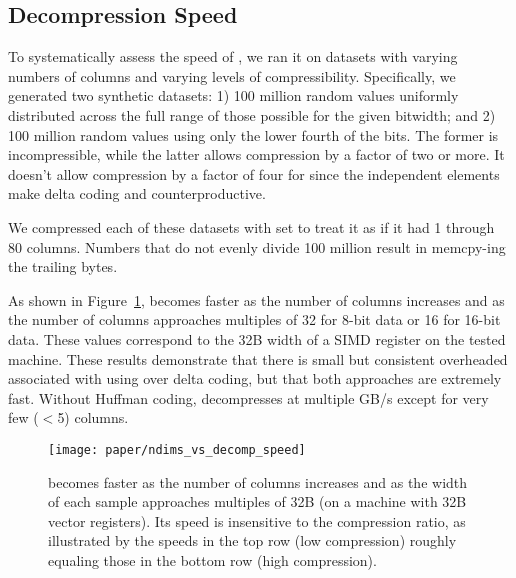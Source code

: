


\subsection{Decompression Speed}

To systematically assess the speed of \minesp, we ran it on datasets with varying numbers of columns and varying levels of compressibility. Specifically, we generated two synthetic datasets: 1) 100 million random values uniformly distributed across the full range of those possible for the given bitwidth; and 2) 100 million random values using only the lower fourth of the bits. The former is incompressible, while the latter allows compression by a factor of two or more. It doesn't allow compression by a factor of four for \minesp since the independent elements make delta coding and \fire counterproductive.

We compressed each of these datasets with \minesp set to treat it as if it had 1 through 80 columns. Numbers that do not evenly divide 100 million result in \minesp memcpy-ing the trailing bytes.

As shown in Figure~\ref{fig:ndims_vs_decomp_speed}, \minesp becomes faster as the number of columns increases and as the number of columns approaches multiples of 32 for 8-bit data or 16 for 16-bit data. These values correspond to the 32B width of a SIMD register on the tested machine. These results demonstrate that there is small but consistent overheaded associated with using \fire over delta coding, but that both approaches are extremely fast. Without Huffman coding, \mine decompresses at multiple GB/s except for very few ($<$5) columns.

\begin{figure}[h]
\begin{center}
    \texttt{[image: paper/ndims\_vs\_decomp\_speed]}
    \caption{\minesp becomes faster as the number of columns increases and as the width of each sample approaches multiples of 32B (on a machine with 32B vector registers). Its speed is insensitive to the compression ratio, as illustrated by the speeds in the top row (low compression) roughly equaling those in the bottom row (high compression).}
    \label{fig:ndims_vs_decomp_speed}
\end{center}
\end{figure}


